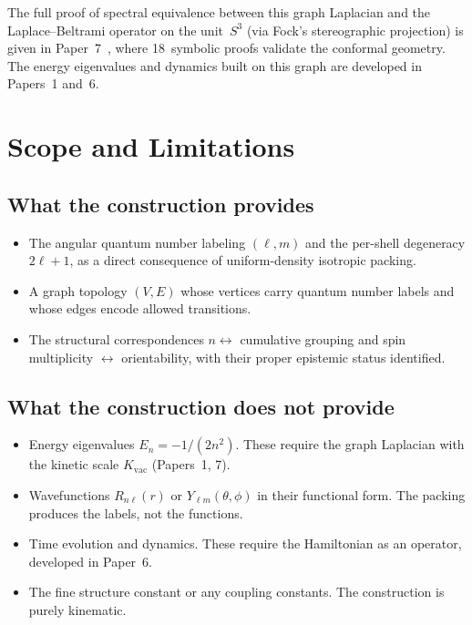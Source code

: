 \documentclass[aps,prl,reprint,amsmath,amssymb]{revtex4-2}
\begin{document}
The full proof of spectral equivalence between this graph Laplacian
and the Laplace--Beltrami operator on the unit~$S^3$ (via Fock's
stereographic projection) is given in Paper~7~\cite{paper7}, where
18~symbolic proofs validate the conformal geometry.  The energy
eigenvalues and dynamics built on this graph are developed in
Papers~1 and~6.


\section{Scope and Limitations}
\label{sec:scope}

\subsection{What the construction provides}

\begin{itemize}
\item[$\checkmark$] The angular quantum number labeling $(\ell, m)$
  and the per-shell degeneracy $2\ell + 1$, as a direct consequence of
  uniform-density isotropic packing.

\item[$\checkmark$] A graph topology $(V, E)$ whose vertices carry
  quantum number labels and whose edges encode allowed transitions.

\item[$\checkmark$] The structural correspondences $n \leftrightarrow$
  cumulative grouping and spin multiplicity $\leftrightarrow$
  orientability, with their proper epistemic status identified.
\end{itemize}

\subsection{What the construction does not provide}

\begin{itemize}
\item[$\times$] Energy eigenvalues $E_n = -1/(2n^2)$.  These require
  the graph Laplacian with the kinetic scale $K_{\mathrm{vac}}$
  (Papers~1, 7).

\item[$\times$] Wavefunctions $R_{n\ell}(r)$ or
  $Y_{\ell m}(\theta, \phi)$ in their functional form.  The packing
  produces the labels, not the functions.

\item[$\times$] Time evolution and dynamics.  These require the
  Hamiltonian as an operator, developed in Paper~6.

\item[$\times$] The fine structure constant or any coupling constants.
  The construction is purely kinematic.
\end{itemize}
\end{document}
